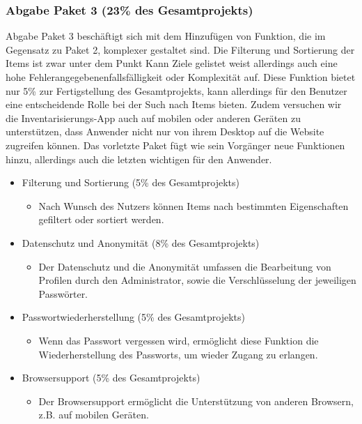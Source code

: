 \documentclass[11pt,a4paper]{report}
\begin{document}
\subsubsection{Abgabe Paket 3 (23\% des Gesamtprojekts)}
Abgabe Paket 3 beschäftigt sich mit dem Hinzufügen von Funktion, die im Gegensatz zu Paket 2, komplexer gestaltet sind.
Die Filterung und Sortierung der Items ist zwar unter dem Punkt Kann Ziele gelistet weist allerdings auch eine hohe Fehlerangegebenenfallsfälligkeit oder Komplexität auf.
Diese Funktion bietet nur 5\% zur Fertigstellung des Gesamtprojekts, kann allerdings für den Benutzer eine entscheidende Rolle bei der Such nach Items bieten.
Zudem versuchen wir die Inventarisierungs-App auch auf mobilen oder anderen Geräten zu unterstützen, dass Anwender nicht nur von ihrem Desktop auf die Website zugreifen können.
Das vorletzte Paket fügt wie sein Vorgänger neue Funktionen hinzu, allerdings auch die letzten wichtigen für den Anwender.
\begin{itemize}
\item
  Filterung und Sortierung (5\% des Gesamtprojekts)

  \begin{itemize}
  \item
    Nach Wunsch des Nutzers können Items nach bestimmten Eigenschaften gefiltert oder sortiert 			werden.
  \end{itemize}
  
\item
  Datenschutz und Anonymität (8\% des Gesamtprojekts)

  \begin{itemize}
  \item
    Der Datenschutz und die Anonymität umfassen die Bearbeitung von
    Profilen durch den Administrator, sowie die Verschlüsselung der
    jeweiligen Passwörter.
  \end{itemize}
  
\item
  Passwortwiederherstellung (5\% des Gesamtprojekts)

  \begin{itemize}
  \item
    Wenn das Passwort vergessen wird, ermöglicht diese Funktion die Wiederherstellung des 				Passworts, um wieder Zugang zu erlangen.
  \end{itemize}
  
\item
  Browsersupport (5\% des Gesamtprojekts)

  \begin{itemize}
  \item
    Der Browsersupport ermöglicht die Unterstützung von anderen Browsern, z.B. auf mobilen
    Geräten.
  \end{itemize}
  
\end{itemize}
\end{document}
